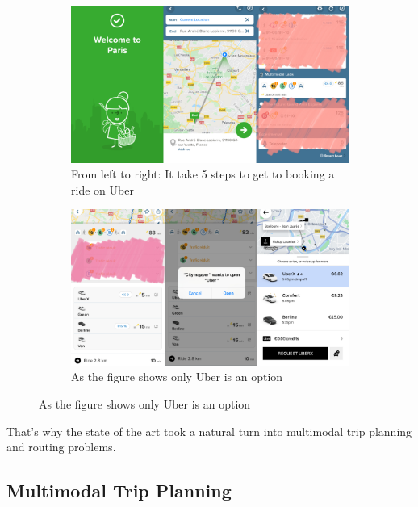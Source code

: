 \documentclass{article}
\begin{document}
\begin{figure}[H]
\label{fig:citymapper_exp}
    \centering 
\begin{subfigure}{\textwidth}
  \includegraphics[width=\linewidth]{pictures/citymapper_experiment/Citymapper_experiment_1}
  \caption{From left to right: It take 5 steps to get to booking a ride on Uber}
\end{subfigure}
\medskip
\begin{subfigure}{\textwidth}
  \includegraphics[width=\linewidth]{pictures/citymapper_experiment/Citymapper_experiment_2}
  \caption{As the figure shows only Uber is an option}
\end{subfigure}
\end{figure}

That\rq{s} why the state of the art took a natural turn into multimodal trip planning and routing problems.


\subsection{Multimodal Trip Planning}
\label{subsec:Intermodal}
\end{document}
